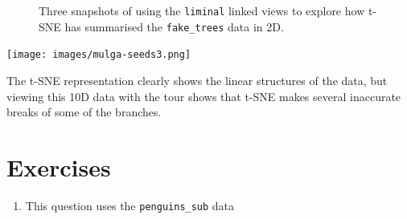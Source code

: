 \documentclass[
  letterpaper,
]{krantz}
\providecommand{\tightlist}{%
  \setlength{\itemsep}{0pt}\setlength{\parskip}{0pt}}\usepackage{longtable,booktabs,array}
\newcommand{\insightbox}[1]{%
\noindent\colorbox{insight!30}{%
\begin{minipage}{0.98\textwidth}%
    \centering%
    \begin{minipage}[c]{0.15\textwidth} %
      \texttt{[image: images/mulga-seeds3.png]} %
    \end{minipage}%
    \hfill %
    \begin{minipage}[c]{0.8\textwidth} %
      \bigskip%
      \textsf{#1}%
      \bigskip%
    \end{minipage}%
    \hspace*{3mm}%
  \end{minipage}%
}%
}
\begin{document}
\begin{figure}
\begin{minipage}{\linewidth}


\end{minipage}%

\caption{\label{fig-liminal-trees}Three snapshots of using the
\texttt{liminal} linked views to explore how t-SNE has summarised the
\texttt{fake\_trees} data in 2D.}

\end{figure}%

\insightbox{The t-SNE representation clearly shows the linear structures of the data, but viewing this 10D data with the tour shows that t-SNE makes several inaccurate breaks of some of the branches. }

\section*{Exercises}\label{exercises-4}


\begin{enumerate}
\def\labelenumi{\arabic{enumi}.}
\tightlist
\item
  This question uses the \texttt{penguins\_sub} data
\end{enumerate}
\end{document}
